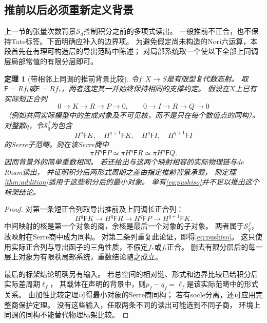 \documentclass[11pt,a4paper]{ctexart}
\theoremstyle{cnplain}\newtheorem{theorem}{定理}[section]
\theoremstyle{definition}\newtheorem{definition}[theorem]{定义}
\theoremstyle{remark}\newtheorem{remark}[theorem]{注}
\newcommand{\cS}{\mathcal S}\newcommand{\dR}{\mathrm{dR}}
\begin{document}
\subsection{推前以后必须重新定义背景}
上一节的张量次数背景$\cS_d$控制积分之前的多项式读出。
一般推前不正合，也不保持Tate标签。下面明确应补入的边界项。
为避免假定尚未构造的Nori六运算，本段首先在有理可构造层的导出范畴中陈述；
对局部系统取一个使以下全部上同调层局部常值的有限分层即可。

\begin{theorem}[带相邻上同调的推前背景比较]\label{thm:pushbackground}
令$f:X\to S$是有限型复代数态射。
取$\mathsf F=Rf_!$或$\mathsf F=Rf_*$，两者选定其一并始终保持相同的支撑约定。
假设在$X$上已有实际短正合列
\[
 0\to K\to R\to P\to0,\qquad
 0\to I\to R\to Q\to0
\]
（例如共同实际模型中的生成对象及不可见核，而不是只在每个数值点的同构）。
对整数$q$，令$\mathcal S^f_q$为包含
\begin{equation}\label{eq:pushbg}
 H^q\mathsf F K,\quad H^{q+1}\mathsf F K,\quad
 H^q\mathsf F I,\quad H^{q+1}\mathsf F I
\end{equation}
的Serre子范畴。则在该Serre商中
\begin{equation}\label{eq:pushiso}
 \pi H^q\mathsf F P
   \simeq\pi H^q\mathsf F R
   \simeq\pi H^q\mathsf F Q .
\end{equation}
因而背景外的简单重数相同。
若还给出与这两个映射相容的实际物理链与de Rham读出，
并证明积分后两形式周期之差由指定推前背景承载，
则定理\ref{thm:addition}适用于这些\emph{积分后的}最小对象。
单有\eqref{eq:pushiso}并不足以推出这个标架结论。
\end{theorem}
\begin{proof}
对第一条短正合列取导出推前及上同调长正合列：
\[
 H^q\mathsf F K\longrightarrow H^q\mathsf F R
 \longrightarrow H^q\mathsf F P
 \longrightarrow H^{q+1}\mathsf F K .
\]
中间映射的核是第一个对象的商，余核是最后一个对象的子对象。
两者属于$\mathcal S^f_q$，故映射在Serre商中成为同构。
对第二条列重复此论证，即得\eqref{eq:pushiso}。
这只使用实际正合列与导出函子的三角性质，不假定$f_*$或$f_!$正合。
删去有限分层后的每一层上对象为有限秩局部系统，重数结论随之成立。

最后的标架结论明确另有输入。
若总空间的相对链、形式和边界比较已给积分后实际差周期$\ell_f$，
其载体在声明的背景中，则$p_f-q_f=\ell_f$是该实际范畴中的形式关系。
由加性比较定理可得最小对象的Serre商同构；
若有socle分离，还可应用完整商保护定理。
没有这些输入，任取两条不同的读出可能选到不同子商，
环境上同调的同构不能替代物理标架比较。
\end{proof}
\end{document}

